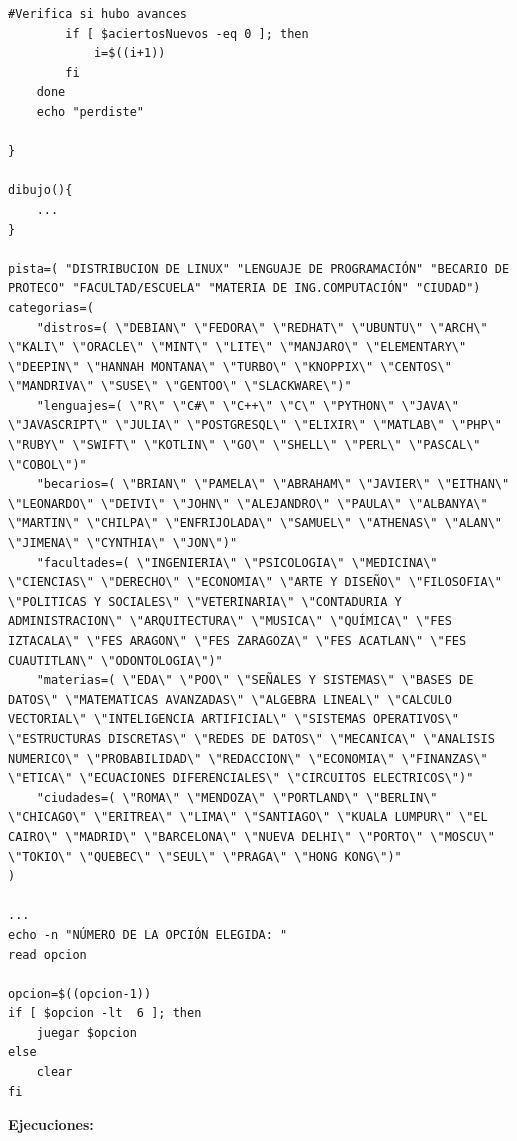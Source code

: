 \documentclass[letter,12pt]{article} %
\begin{document}
\begin{lstlisting}[style=BashInputStyle]
        #Verifica si hubo avances
        if [ $aciertosNuevos -eq 0 ]; then
            i=$((i+1))
        fi
    done
    echo "perdiste"

}

dibujo(){
    ...
}

pista=( "DISTRIBUCION DE LINUX" "LENGUAJE DE PROGRAMACIÓN" "BECARIO DE PROTECO" "FACULTAD/ESCUELA" "MATERIA DE ING.COMPUTACIÓN" "CIUDAD")
categorias=(
    "distros=( \"DEBIAN\" \"FEDORA\" \"REDHAT\" \"UBUNTU\" \"ARCH\" \"KALI\" \"ORACLE\" \"MINT\" \"LITE\" \"MANJARO\" \"ELEMENTARY\" \"DEEPIN\" \"HANNAH MONTANA\" \"TURBO\" \"KNOPPIX\" \"CENTOS\" \"MANDRIVA\" \"SUSE\" \"GENTOO\" \"SLACKWARE\")"
    "lenguajes=( \"R\" \"C#\" \"C++\" \"C\" \"PYTHON\" \"JAVA\" \"JAVASCRIPT\" \"JULIA\" \"POSTGRESQL\" \"ELIXIR\" \"MATLAB\" \"PHP\" \"RUBY\" \"SWIFT\" \"KOTLIN\" \"GO\" \"SHELL\" \"PERL\" \"PASCAL\" \"COBOL\")"
    "becarios=( \"BRIAN\" \"PAMELA\" \"ABRAHAM\" \"JAVIER\" \"EITHAN\" \"LEONARDO\" \"DEIVI\" \"JOHN\" \"ALEJANDRO\" \"PAULA\" \"ALBANYA\" \"MARTIN\" \"CHILPA\" \"ENFRIJOLADA\" \"SAMUEL\" \"ATHENAS\" \"ALAN\" \"JIMENA\" \"CYNTHIA\" \"JON\")"
    "facultades=( \"INGENIERIA\" \"PSICOLOGIA\" \"MEDICINA\" \"CIENCIAS\" \"DERECHO\" \"ECONOMIA\" \"ARTE Y DISEÑO\" \"FILOSOFIA\" \"POLITICAS Y SOCIALES\" \"VETERINARIA\" \"CONTADURIA Y ADMINISTRACION\" \"ARQUITECTURA\" \"MUSICA\" \"QUÍMICA\" \"FES IZTACALA\" \"FES ARAGON\" \"FES ZARAGOZA\" \"FES ACATLAN\" \"FES CUAUTITLAN\" \"ODONTOLOGIA\")"
    "materias=( \"EDA\" \"POO\" \"SEÑALES Y SISTEMAS\" \"BASES DE DATOS\" \"MATEMATICAS AVANZADAS\" \"ALGEBRA LINEAL\" \"CALCULO VECTORIAL\" \"INTELIGENCIA ARTIFICIAL\" \"SISTEMAS OPERATIVOS\" \"ESTRUCTURAS DISCRETAS\" \"REDES DE DATOS\" \"MECANICA\" \"ANALISIS NUMERICO\" \"PROBABILIDAD\" \"REDACCION\" \"ECONOMIA\" \"FINANZAS\" \"ETICA\" \"ECUACIONES DIFERENCIALES\" \"CIRCUITOS ELECTRICOS\")"
    "ciudades=( \"ROMA\" \"MENDOZA\" \"PORTLAND\" \"BERLIN\" \"CHICAGO\" \"ERITREA\" \"LIMA\" \"SANTIAGO\" \"KUALA LUMPUR\" \"EL CAIRO\" \"MADRID\" \"BARCELONA\" \"NUEVA DELHI\" \"PORTO\" \"MOSCU\" \"TOKIO\" \"QUEBEC\" \"SEUL\" \"PRAGA\" \"HONG KONG\")"
)

...
echo -n "NÚMERO DE LA OPCIÓN ELEGIDA: "
read opcion

opcion=$((opcion-1))
if [ $opcion -lt  6 ]; then
    juegar $opcion 
else
    clear
fi

\end{lstlisting}
\textbf{Ejecuciones:} \par
\end{document}

